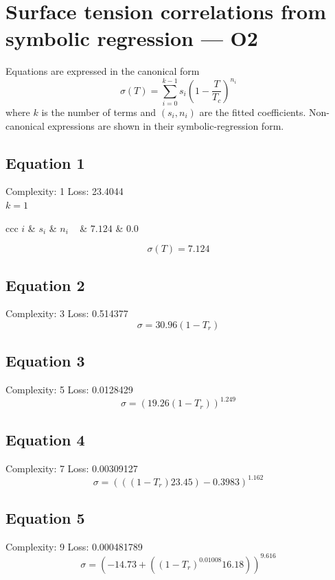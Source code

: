 \documentclass[11pt]{article}
\begin{document}
\section*{Surface tension correlations from symbolic regression — O2}
\noindent Equations are expressed in the canonical form
\[
  \sigma(T) = \sum_{i=0}^{k-1} s_i \left(1 - \frac{T}{T_c}\right)^{\!n_i}
\]
where $k$ is the number of terms and $(s_i, n_i)$ are the fitted coefficients.
Non-canonical expressions are shown in their symbolic-regression form.

\subsection*{Equation 1}
\noindent Complexity: 1 \quad Loss: 23.4044 \\[4pt]
\noindent $k = 1$ \\[2pt]
\begin{center}
\begin{tabular}{ccc}
\toprule
$i$ & $s_i$ & $n_i$ \
 & $7.124$ & $0.0$ \\
\bottomrule
\end{tabular}
\end{center}
\[
\sigma(T) = 7.124
\]

\subsection*{Equation 2}
\noindent Complexity: 3 \quad Loss: 0.514377 \\[4pt]
\[
\sigma = 30.96 (1 - T_r)
\]

\subsection*{Equation 3}
\noindent Complexity: 5 \quad Loss: 0.0128429 \\[4pt]
\[
\sigma = \left(19.26 (1 - T_r)\right)^{1.249}
\]

\subsection*{Equation 4}
\noindent Complexity: 7 \quad Loss: 0.00309127 \\[4pt]
\[
\sigma = \left(((1 - T_r) 23.45) - 0.3983\right)^{1.162}
\]

\subsection*{Equation 5}
\noindent Complexity: 9 \quad Loss: 0.000481789 \\[4pt]
\[
\sigma = \left(-14.73 + (\left(1 - T_r\right)^{0.01008} 16.18)\right)^{9.616}
\]
\end{document}

